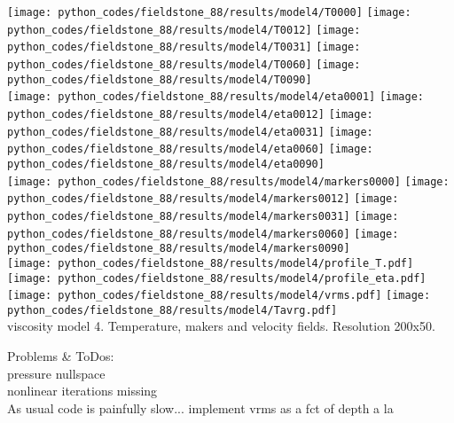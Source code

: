 \begin{center}
\texttt{[image: python\_codes/fieldstone\_88/results/model4/T0000]}
\texttt{[image: python\_codes/fieldstone\_88/results/model4/T0012]}
\texttt{[image: python\_codes/fieldstone\_88/results/model4/T0031]}
\texttt{[image: python\_codes/fieldstone\_88/results/model4/T0060]}
\texttt{[image: python\_codes/fieldstone\_88/results/model4/T0090]}\\
\texttt{[image: python\_codes/fieldstone\_88/results/model4/eta0001]}
\texttt{[image: python\_codes/fieldstone\_88/results/model4/eta0012]}
\texttt{[image: python\_codes/fieldstone\_88/results/model4/eta0031]}
\texttt{[image: python\_codes/fieldstone\_88/results/model4/eta0060]}
\texttt{[image: python\_codes/fieldstone\_88/results/model4/eta0090]}\\
\texttt{[image: python\_codes/fieldstone\_88/results/model4/markers0000]}
\texttt{[image: python\_codes/fieldstone\_88/results/model4/markers0012]}
\texttt{[image: python\_codes/fieldstone\_88/results/model4/markers0031]}
\texttt{[image: python\_codes/fieldstone\_88/results/model4/markers0060]}
\texttt{[image: python\_codes/fieldstone\_88/results/model4/markers0090]}\\
\texttt{[image: python\_codes/fieldstone\_88/results/model4/profile\_T.pdf]}
\texttt{[image: python\_codes/fieldstone\_88/results/model4/profile\_eta.pdf]}
\texttt{[image: python\_codes/fieldstone\_88/results/model4/vrms.pdf]}
\texttt{[image: python\_codes/fieldstone\_88/results/model4/Tavrg.pdf]}\\
{\captionfont viscosity model 4. Temperature, makers and velocity fields. Resolution 200x50.}
\end{center} 







\vspace{2cm}

Problems \& ToDos: \\
pressure nullspace \\
nonlinear iterations missing\\
As usual code is painfully slow...
implement vrms as a fct of depth a la \cite{king15}
